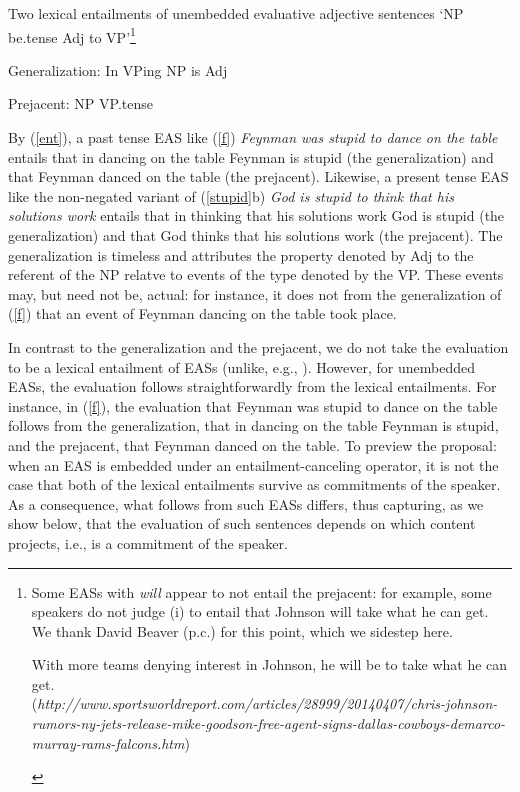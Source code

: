 \documentclass[11pt,fleqn]{article}
\newcommand{\6}{\mbox{$[\hspace*{-.6mm}[$}}
\newcommand{\9}{\mbox{$]\hspace*{-.6mm}]$}}
\begin{document}
\begin{exe}
\ex\label{ent} Two lexical entailments of unembedded evaluative adjective sentences `NP be{\sc .tense} Adj to VP'\footnote{Some EASs with {\em will} appear to not entail the prejacent: for example, some speakers do not judge (i) to entail that Johnson will take what he can get. We thank David Beaver (p.c.) for this point, which we sidestep here.
\begin{exe}
 With more teams denying interest in Johnson, he will be 
to take what he can get. \\ ({\em http://www.sportsworldreport.com/articles/28999/20140407/chris-johnson-rumors-ny-jets-release-mike-goodson-free-agent-signs-dallas-cowboys-demarco-murray-rams-falcons.htm})
\end{exe}} 

\begin{xlist}

\ex Generalization: In VPing NP is Adj

\ex Prejacent: NP VP{\sc .tense}

\end{xlist}
\end{exe}
By (\ref{ent}), a past tense EAS like (\ref{f}) {\em Feynman was stupid to dance on the table} entails that in dancing on the table Feynman is stupid (the generalization) and that Feynman danced on the table (the prejacent). Likewise, a present tense EAS like the non-negated variant of (\ref{stupid}b) {\em God is stupid to think that his solutions work} entails that in thinking that his solutions work God is stupid (the generalization) and that God thinks that his solutions work (the prejacent). The generalization is timeless and attributes the property denoted by Adj to the referent of the NP relatve to events of the type denoted by the VP. These events may, but need not be, actual: for instance, it does not from the generalization of (\ref{f}) that an event of Feynman dancing on the table took place.

In contrast to the generalization and the prejacent, we do not take the evaluation to be a lexical entailment of EASs (unlike, e.g., \citealt{barker02}). However, for unembedded EASs, the evaluation follows straightforwardly from the lexical entailments. For instance, in (\ref{f}), the evaluation that Feynman was stupid to dance on the table follows from the generalization, that in dancing on the table Feynman is stupid, and the prejacent, that Feynman danced on the table. To preview the proposal: when an EAS is embedded under an entailment-canceling operator, it is not the case that both of the lexical entailments survive as commitments of the speaker. As a consequence, what follows from such EASs differs, thus capturing, as we show below, that the evaluation of such sentences depends on which content projects, i.e., is a commitment of the speaker.
\end{document}
